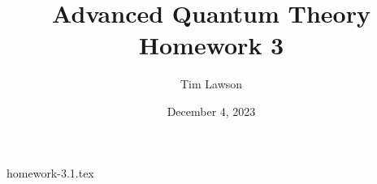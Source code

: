 \documentclass[a4paper]{extarticle}
\title{Advanced Quantum Theory\\
\large Homework 3}
\author{Tim Lawson}
\date{December 4, 2023}
\begin{document}
\maketitle

{homework-3.1.tex}
\end{document}
